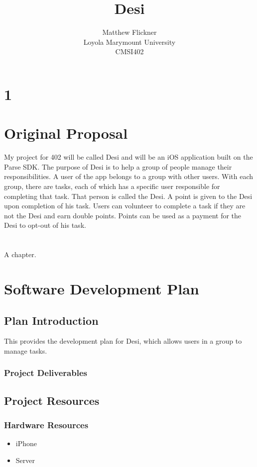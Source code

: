 \documentclass[11pt, a4paper]{report}
\title{Desi}
\author{Matthew Flickner \\ Loyola Marymount University\\ CMSI402}
\providecommand\phantomsection{}
\begin{document}
\clearpage
\phantomsection
{}
\maketitle


\tableofcontents
\newpage
 
\chapter{1}

\chapter{Original Proposal}
My project for 402 will be called Desi and will be an iOS application built on the Parse SDK. The purpose of Desi is to help a group of people manage their responsibilities. A user of the app belongs to a group with other users. With each group, there are tasks, each of which has a specific user responsible for completing that task. That person is called the Desi. A point is given to the Desi upon completion of his task. Users can volunteer to complete a task if they are not the Desi and earn double points. Points can be used as a payment for the Desi to opt-out of his task.

\chapter{}
 A chapter.

\chapter{Software Development Plan}
\section{Plan Introduction}
This provides the development plan for Desi, which allows users in a group to manage tasks.
\subsection{Project Deliverables}

\section{Project Resources}
\subsection{Hardware Resources}
\begin{itemize}
\item iPhone
\item Server
\end{itemize}
\end{document}
